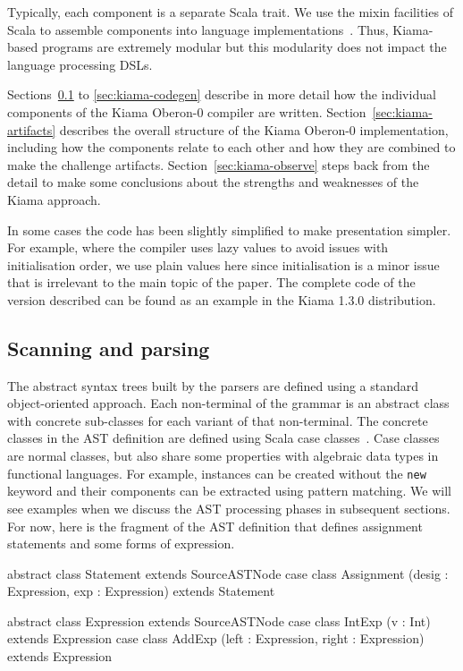 \noindent
Typically, each component is a separate Scala trait.
We use the mixin facilities of Scala to assemble components into language implementations~\cite[chapter 12]{Odersky10d}.
Thus, Kiama-based programs are extremely modular but this modularity does not impact the language processing DSLs.

Sections~\ref{sec:kiama-scanparse} to \ref{sec:kiama-codegen} describe in more detail how the individual components of the Kiama Oberon-0 compiler are written.
Section~\ref{sec:kiama-artifacts} describes the overall structure of the Kiama Oberon-0 implementation, including how the components relate to each other and how they are combined to make the challenge artifacts.
Section~\ref{sec:kiama-observe} steps back from the detail to make some conclusions about the strengths and weaknesses of the Kiama approach.

In some cases the code has been slightly simplified to make presentation simpler.
For example, where the compiler uses lazy values to avoid issues with initialisation order, we use plain values here since initialisation is a minor issue that is irrelevant to the main topic of the paper.
The complete code of the version described can be found as an example in the Kiama 1.3.0 distribution.

\subsection{Scanning and parsing}
\label{sec:kiama-scanparse}

The abstract syntax trees built by the parsers are defined using a standard object-oriented approach.
Each non-terminal of the grammar is an abstract class with concrete sub-classes for each variant of that non-terminal.
The concrete classes in the AST definition are defined using Scala case classes~\cite[chapter 15]{Odersky10d}.
Case classes are normal classes, but also share some properties with algebraic data types in functional languages.
For example, instances can be created without the \verb|new| keyword and their components can be extracted using pattern matching.
We will see examples when we discuss the AST processing phases in subsequent sections.
For now, here is the fragment of the AST definition that defines assignment statements and some forms of expression.

\begin{scala}
  abstract class Statement extends SourceASTNode
  case class Assignment (desig : Expression, exp : Expression)
    extends Statement
  
  abstract class Expression extends SourceASTNode
  case class IntExp (v : Int) extends Expression
  case class AddExp (left : Expression, right : Expression)
    extends Expression
\end{scala}

